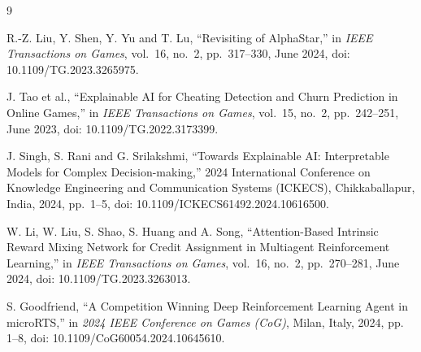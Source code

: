 \documentclass[12pt,a4paper]{article}
\begin{document}
\begin{thebibliography}{9}
    \setlength{\itemsep}{0.5em}

     R.-Z. Liu, Y. Shen, Y. Yu and T. Lu, ``Revisiting of AlphaStar,'' in \textit{IEEE Transactions on Games}, vol.~16, no.~2, pp.~317--330, June 2024, doi: 10.1109/TG.2023.3265975.

     J. Tao et al., ``Explainable AI for Cheating Detection and Churn Prediction in Online Games,'' in \textit{IEEE Transactions on Games}, vol.~15, no.~2, pp.~242--251, June 2023, doi: 10.1109/TG.2022.3173399.

     J. Singh, S. Rani and G. Srilakshmi, ``Towards Explainable AI: Interpretable Models for Complex Decision-making,'' 2024 International Conference on Knowledge Engineering and Communication Systems (ICKECS), Chikkaballapur, India, 2024, pp.~1--5, doi: 10.1109/ICKECS61492.2024.10616500.

     W. Li, W. Liu, S. Shao, S. Huang and A. Song, ``Attention-Based Intrinsic Reward Mixing Network for Credit Assignment in Multiagent Reinforcement Learning,'' in \textit{IEEE Transactions on Games}, vol.~16, no.~2, pp.~270--281, June 2024, doi: 10.1109/TG.2023.3263013.

     S. Goodfriend, ``A Competition Winning Deep Reinforcement Learning Agent in microRTS,'' in \emph{2024 IEEE Conference on Games (CoG)}, Milan, Italy, 2024, pp. 1--8, doi: 10.1109/CoG60054.2024.10645610.
\end{thebibliography}
\end{document}
